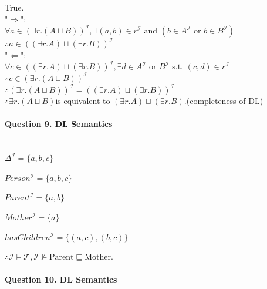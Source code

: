 \documentclass[12pt]{article}
\begin{document}
\begin{enumerate}
        True. \\
        "$\Longrightarrow$": \\
        $\forall a \in \left(\exists r.(A \sqcup B)\right)^{\mathcal{I}}, \exists (a, b) \in r^{\mathcal{I}} \text{ and } (b\in A^{\mathcal{I}} \text{ or } b \in B^{\mathcal{I}})$ \\
        $\therefore a\in ((\exists r.A) \sqcup (\exists r.B))^{\mathcal{I}}$ \\
        "$\Longleftarrow$": \\
        $\forall c \in ((\exists r.A) \sqcup (\exists r.B))^{\mathcal{I}}, \exists d \in A^{\mathcal{I}} \text{ or } B^{\mathcal{I}} \text{ s.t. } (c, d) \in r^{\mathcal{I}}$ \\
        $\therefore c \in \left(\exists r.(A \sqcup B)\right)^{\mathcal{I}}$ \\
        $\therefore \left(\exists r.(A \sqcup B)\right)^{\mathcal{I}} = \left((\exists r.A) \sqcup (\exists r.B)\right)^{\mathcal{I}}$ \\
        $\therefore \exists r.(A \sqcup B)$is equivalent to $(\exists r.A) \sqcup (\exists r.B)$.(completeness of DL)
    \end{enumerate}

    \paragraph{Question 9. DL Semantics}~{}
    \\

    $\Delta^{\mathcal{I}} = \{a, b, c\}$ \par
    $Person^{\mathcal{I}} = \{a, b, c\}$ \par
    $Parent^{\mathcal{I}} = \{a, b\}$ \par
    $Mother^{\mathcal{I}} = \{a\}$ \par
    $hasChildren^{\mathcal{I}} = \{(a, c), (b, c)\}$ \par
    $\therefore \mathcal{I} \models \mathcal{T}, \mathcal{I} \not \models \text{Parent} \sqsubseteq \text{Mother}$.

    \paragraph{Question 10. DL Semantics}~{}
    \\
\end{document}
